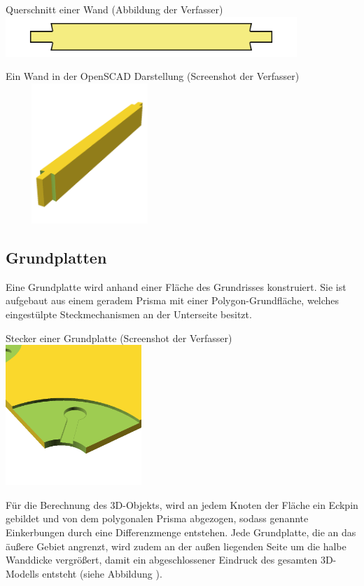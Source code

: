 \begin{Bild}{Querschnitt einer Wand (Abbildung der Verfasser)}
	\includegraphics[width = 110mm]{Bilder/Wand2D-04}
\end{Bild}

\begin{Bild}{Ein Wand in der OpenSCAD Darstellung (Screenshot der Verfasser)}
	\includegraphics[height=200px, width=240px]{Bilder/Untereinheit_Wand}
\end{Bild}

\newpage
\subsection{Grundplatten}
\label{gr}
Eine Grundplatte wird anhand einer Fläche des Grundrisses konstruiert.
Sie ist aufgebaut aus einem geradem Prisma mit einer Polygon-Grundfläche, welches eingestülpte Steckmechanismen an der Unterseite besitzt.

\begin{Bild}{Stecker einer Grundplatte (Screenshot der Verfasser)}
	\includegraphics[height=200px]{Bilder/Untereinheit_GP}
\end{Bild}

Für die Berechnung des 3D-Objekts, wird an jedem Knoten der Fläche ein Eckpin gebildet und von dem polygonalen Prisma abgezogen, sodass genannte Einkerbungen durch eine Differenzmenge entstehen.
Jede Grundplatte, die an das äußere Gebiet angrenzt, wird zudem an der außen liegenden Seite um die halbe Wanddicke vergrößert, damit ein abgeschlossener Eindruck des gesamten 3D-Modells entsteht (siehe Abbildung \thebildnrnext).

